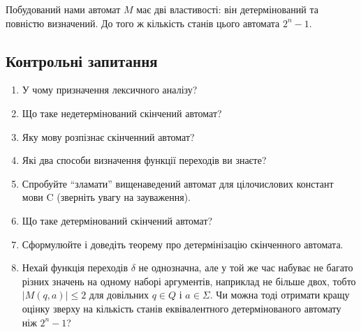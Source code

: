 Побудований нами автомат $M$ має дві властивості: він детермінований та повністю визначений. До того ж кількість станів цього автомата $2^n - 1$.

\subsection{Контрольні запитання}

\begin{enumerate}
	\item У чому призначення лексичного аналізу? %
	\item Що таке недетермінований скінчений автомат? %
	\item Яку мову розпізнає скінченний автомат? %
	\item Які два способи визначення функції переходів ви знаєте? %
	\item Спробуйте ``зламати'' вищенаведений автомат для цілочислових констант мови C (зверніть увагу на зауваження). %
	\item Що таке детермінований скінчений автомат? %
	\item Сформулюйте і доведіть теорему про детермінізацію скінченного автомата.
	\item Нехай функція переходів $\delta$ не однозначна, але у той же час набуває не багато різних значень на одному наборі аргументів, наприклад не більше двох, тобто $|M(q, a)| \le 2$ для довільних $q \in Q$ і $a \in \Sigma$. Чи можна тоді отримати кращу оцінку зверху на кількість станів еквівалентного детермінованого автомату ніж $2^n - 1$?
\end{enumerate}
